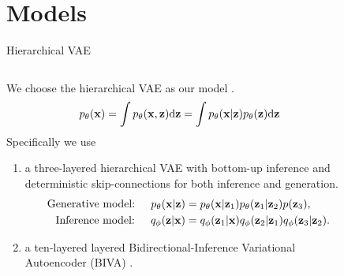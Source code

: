 \section{Models}

\begin{frame}{Hierarchical VAE}
  \begin{columns}
      \begin{column}{0.7\textwidth}
          We choose the hierarchical VAE as our model \cite{kingma_autoencoding_2014, rezende_stochastic_2014}.
          \begin{equation*}
              p_\theta({\mathbf{x}}) = \int p_\theta({\mathbf{x}},{\mathbf{z}}) \text{d}{\mathbf{z}} = \int p_\theta({\mathbf{x}}|{\mathbf{z}})p_\theta({\mathbf{z}}) \text{d}{\mathbf{z}}
          \end{equation*}
          Specifically we use
          
          \begin{enumerate}
              \item a three-layered hierarchical VAE with bottom-up inference and deterministic skip-connections for both inference and generation.
              \begin{align*}
                  \text{Generative model: }\quad p_\theta({\mathbf{x}}|{\mathbf{z}}) &= p_\theta({\mathbf{x}}|{\mathbf{z}}_1) p_\theta({\mathbf{z}}_1|{\mathbf{z}}_2) p({\mathbf{z}}_3),\\
                  \text{Inference model: }\quad q_\phi({\mathbf{z}}|{\mathbf{x}}) &= q_\phi({\mathbf{z}}_1|{\mathbf{x}})q_\phi({\mathbf{z}}_2|{\mathbf{z}}_1)q_\phi({\mathbf{z}}_3|{\mathbf{z}}_2).
              \end{align*}
              \item a ten-layered layered Bidirectional-Inference Variational Autoencoder (BIVA) \cite{maaloe_biva_2019}.
          \end{enumerate} 
      \end{column}
      \begin{column}{0.3\textwidth}
          \begin{figure}[.5\textwidth]
\end{figure}
\end{column}
\end{columns}
\end{frame}
